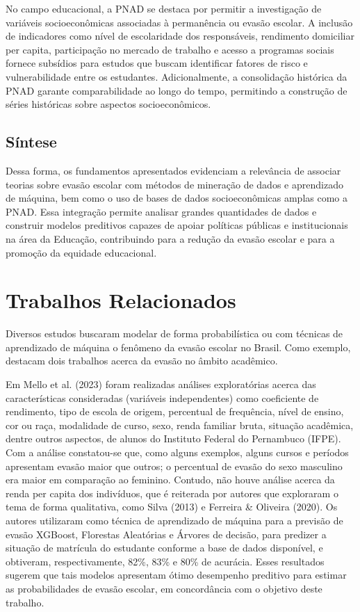 \documentclass[english, spanish, brazilian]{RBIEarticle} %
\begin{document}
No campo educacional, a PNAD se destaca por permitir a investigação de variáveis socioeconômicas associadas à permanência ou evasão escolar. A inclusão de indicadores como nível de escolaridade dos responsáveis, rendimento domiciliar per capita, participação no mercado de trabalho e acesso a programas sociais fornece subsídios para estudos que buscam identificar fatores de risco e vulnerabilidade entre os estudantes. Adicionalmente, a consolidação histórica da PNAD garante comparabilidade ao longo do tempo, permitindo a construção de séries históricas sobre aspectos socioeconômicos.

\subsection{Síntese}
Dessa forma, os fundamentos apresentados evidenciam a relevância de associar teorias sobre evasão escolar com métodos de mineração de dados e aprendizado de máquina, bem como o uso de bases de dados socioeconômicas amplas como a PNAD. Essa integração permite analisar grandes quantidades de dados e construir modelos preditivos capazes de apoiar políticas públicas e institucionais na área da Educação, contribuindo para a redução da evasão escolar e para a promoção da equidade educacional.

\section{Trabalhos Relacionados}
Diversos estudos buscaram modelar de forma probabilística ou com técnicas de aprendizado de máquina o fenômeno da evasão escolar no Brasil. Como exemplo, destacam dois trabalhos acerca da evasão no âmbito acadêmico.

Em Mello et al. (2023) foram realizadas análises exploratórias acerca das características consideradas (variáveis independentes) como coeficiente de rendimento, tipo de escola de origem, percentual de frequência, nível de ensino, cor ou raça, modalidade de curso, sexo, renda familiar bruta, situação acadêmica, dentre outros aspectos, de alunos do Instituto Federal do Pernambuco (IFPE). Com a análise constatou-se que, como alguns exemplos, alguns cursos e períodos apresentam evasão maior que outros; o percentual de evasão do sexo masculino era maior em comparação ao feminino. Contudo, não houve análise acerca da renda per capita dos indivíduos, que é reiterada por autores que exploraram o tema de forma qualitativa, como Silva (2013) e Ferreira \& Oliveira (2020). Os autores utilizaram como técnica de aprendizado de máquina para a previsão de evasão XGBoost, Florestas Aleatórias e Árvores de decisão, para predizer a situação de matrícula do estudante conforme a base de dados disponível, e obtiveram, respectivamente, 82\%, 83\% e 80\% de acurácia. Esses resultados sugerem que tais modelos apresentam ótimo desempenho preditivo para estimar as probabilidades de evasão escolar, em concordância com o objetivo deste trabalho.
\end{document}
